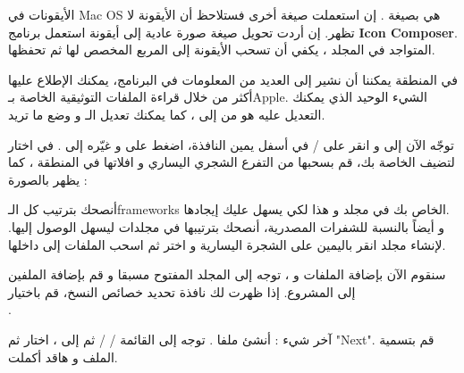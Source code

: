 \begin{information}
الأيقونات في
\textenglish{Mac OS}
هي بصيغة
.
إن استعملت صيغة أخرى فستلاحظ أن الأيقونة لا تظهر. إن أردت تحويل صيغة صورة عادية إلى أيقونة استعمل برنامج 
\textbf{\textenglish{Icon Composer}}.
المتواجد في المجلد
،
يكفي أن تسحب الأيقونة إلى المربع المخصص لها ثم تحفظها.
\end{information}

في المنطقة 
يمكننا أن نشير إلى العديد من المعلومات في البرنامج، يمكنك الإطلاع عليها أكثر من خلال قراءة الملفات التوثيقية الخاصة بـ\textenglish{Apple}.
الشيء الوحيد الذي يمكنك التعديل عليه هو 
من 
إلى 
،
كما يمكنك تعديل الـ
و وضع ما تريد.

توجّه الآن إلى 
و انقر على 
 / 
في أسفل يمين النافذة، اضغط على 
و غيّره إلى 
.
في 
اختار
لتضيف الخاصة بك، قم بسحبها من التفرع الشجري اليساري و افلاتها في المنطقة
،
كما يظهر بالصورة  :


أنصحك بترتيب كل الـ\textenglish{frameworks}
الخاص بك في مجلد 
و هذا لكي يسهل عليك إيجادها.\\
و أيضاً بالنسبة للشفرات المصدرية، أنصحك بترتيبها في مجلدات ليسهل الوصول إليها. لإنشاء مجلد انقر باليمين على الشجرة اليسارية و اختر
ثم اسحب الملفات إلى داخلها.

سنقوم الآن بإضافة الملفات
و 
،
توجه إلى المجلد 
المفتوح مسبقا و قم بإضافة الملفين إلى المشروع. إذا ظهرت لك نافذة تحديد خصائص النسخ، قم باختيار\\
.

آخر شيء : أنشئ ملفا
.
توجه إلى القائمة 
 /  / 
ثم إلى 
، 
اختار 
ثم
"\textenglish{Next}".
قم بتسمية الملف و هاقد أكملت.
